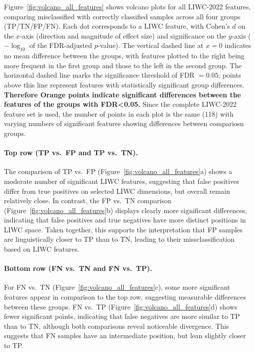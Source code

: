 Figure~\ref{fig:volcano_all_features} shows volcano plots for all LIWC-2022 features, comparing misclassified with correctly classified samples across all four groups (TP/TN/FP/FN). 
Each dot corresponds to a LIWC feature, with Cohen’s $d$ \cite{cohen1988} on the $x$-axis (direction and magnitude of effect size) and significance on the $y$-axis ($-\log_{10}$ of the FDR-adjusted $p$-value). The vertical dashed line at $x=0$ indicates no mean difference between the groups, with features plotted to the right being more frequent in the first group and those to the left in the second group. 
The horizontal dashed line marks the significance threshold of FDR $=0.05$; points above this line represent features with statistically significant group differences. \textbf{Therefore Orange points indicate significant differences between the features of the groups with FDR<0.05.} Since the complete LIWC-2022 feature set is used, the number of points in each plot is the same (118) with varying numbers of significant features showing differences between compariosn groups.

\paragraph{Top row (TP vs.\ FP and TP vs.\ TN).}
The comparison of TP vs.\ FP (Figure~\ref{fig:volcano_all_features}a) shows a moderate number of significant LIWC features,  suggesting that false positives differ from true positives on selected LIWC dimensions, but overall remain relatively close. 
In contrast, the FP vs.\ TN comparison (Figure~\ref{fig:volcano_all_features}b) displays clearly more significant differences, indicating that false positives and true negatives have more distinct positions in LIWC space. 
Taken together, this supports the interpretation that FP samples are linguistically closer to TP than to TN, leading to their missclassification based on LIWC features.

\paragraph{Bottom row (FN vs.\ TN and FN vs.\ TP).}
For FN vs.\ TN (Figure~\ref{fig:volcano_all_features}c), some more significant features appear in comparison to the top row, suggesting measurable differences between these groups. 
FN vs.\ TP (Figure~\ref{fig:volcano_all_features}d) shows fewer significant points, indicating that false negatives are more similar to TP than to TN, although both comparisons reveal noticeable divergence. This suggests that FN samples have an intermediate position, but lean slightly closer to TP.

